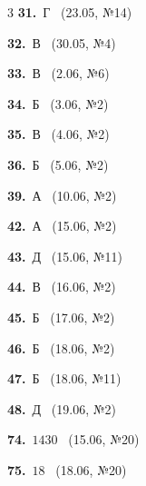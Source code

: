 \documentclass[12pt]{article}
\begin{document}
\ifshowsolutions
{}
\begin{multicols}{3}\noindent
\noindent\textbf{31.}~Г \ {\scriptsize\color{gray}(23.05, №14)}\par
\noindent\textbf{32.}~В \ {\scriptsize\color{gray}(30.05, №4)}\par
\noindent\textbf{33.}~В \ {\scriptsize\color{gray}(2.06, №6)}\par
\noindent\textbf{34.}~Б \ {\scriptsize\color{gray}(3.06, №2)}\par
\noindent\textbf{35.}~В \ {\scriptsize\color{gray}(4.06, №2)}\par
\noindent\textbf{36.}~Б \ {\scriptsize\color{gray}(5.06, №2)}\par
\noindent\textbf{39.}~А \ {\scriptsize\color{gray}(10.06, №2)}\par
\noindent\textbf{42.}~А \ {\scriptsize\color{gray}(15.06, №2)}\par
\noindent\textbf{43.}~Д \ {\scriptsize\color{gray}(15.06, №11)}\par
\noindent\textbf{44.}~В \ {\scriptsize\color{gray}(16.06, №2)}\par
\noindent\textbf{45.}~Б \ {\scriptsize\color{gray}(17.06, №2)}\par
\noindent\textbf{46.}~Б \ {\scriptsize\color{gray}(18.06, №2)}\par
\noindent\textbf{47.}~Б \ {\scriptsize\color{gray}(18.06, №11)}\par
\noindent\textbf{48.}~Д \ {\scriptsize\color{gray}(19.06, №2)}\par
\noindent\textbf{74.}~$1430$ \ {\scriptsize\color{gray}(15.06, №20)}\par
\noindent\textbf{75.}~$18$ \ {\scriptsize\color{gray}(18.06, №20)}\par
\end{multicols}
\fi

\endgroup
\end{document}
